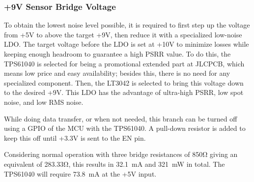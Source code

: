\documentclass[11pt]{article}
\begin{document}
\subsubsection{+9V Sensor Bridge Voltage}
To obtain the lowest noise level possible, it is required to first step up the voltage from 
+5V to above the target +9V, then reduce it with a specialized low-noise LDO. The target 
voltage before the LDO is set at +10V to minimize losses while keeping enough headroom to 
guarantee a high PSRR value. To do this, the TPS61040 is selected for being a promotional 
extended part at JLCPCB, which means low price and easy availability; besides this, there 
is no need for any specialized component. Then, the LT3042 is selected to bring this voltage 
down to the desired +9V. This LDO has the advantage of ultra-high PSRR, low spot noise, and 
low RMS noise. 

While doing data transfer, or when not needed, this branch can be turned off using a GPIO of 
the MCU with the TPS61040. A pull-down resistor is added to keep this off until +3.3V is sent 
to the EN pin.

Considering normal operation with three bridge resistances of 850\si{\ohm} giving an equivalent 
of 283.33\si{\ohm}, this results in 32.1~mA and 321~mW in total. The 
TPS61040 will require 73.8~mA at the +5V input.
\end{document}
